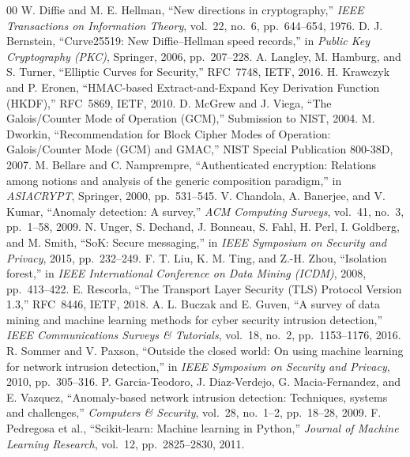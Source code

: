 \documentclass[onecolumn]{article}
\begin{document}
\begin{thebibliography}{00}
 W. Diffie and M. E. Hellman, ``New directions in cryptography,'' \emph{IEEE Transactions on Information Theory}, vol.~22, no.~6, pp.~644--654, 1976.
 D. J. Bernstein, ``Curve25519: New Diffie--Hellman speed records,'' in \emph{Public Key Cryptography (PKC)}, Springer, 2006, pp.~207--228.
 A. Langley, M. Hamburg, and S. Turner, ``Elliptic Curves for Security,'' RFC~7748, IETF, 2016.
 H. Krawczyk and P. Eronen, ``HMAC-based Extract-and-Expand Key Derivation Function (HKDF),'' RFC~5869, IETF, 2010.
 D. McGrew and J. Viega, ``The Galois/Counter Mode of Operation (GCM),'' Submission to NIST, 2004.
 M. Dworkin, ``Recommendation for Block Cipher Modes of Operation: Galois/Counter Mode (GCM) and GMAC,'' NIST Special Publication 800-38D, 2007.
 M. Bellare and C. Namprempre, ``Authenticated encryption: Relations among notions and analysis of the generic composition paradigm,'' in \emph{ASIACRYPT}, Springer, 2000, pp.~531--545.
 V. Chandola, A. Banerjee, and V. Kumar, ``Anomaly detection: A survey,'' \emph{ACM Computing Surveys}, vol.~41, no.~3, pp.~1--58, 2009.
 N. Unger, S. Dechand, J. Bonneau, S. Fahl, H. Perl, I. Goldberg, and M. Smith, ``SoK: Secure messaging,'' in \emph{IEEE Symposium on Security and Privacy}, 2015, pp.~232--249.
 F. T. Liu, K. M. Ting, and Z.-H. Zhou, ``Isolation forest,'' in \emph{IEEE International Conference on Data Mining (ICDM)}, 2008, pp.~413--422.
 E. Rescorla, ``The Transport Layer Security (TLS) Protocol Version 1.3,'' RFC~8446, IETF, 2018.
 A. L. Buczak and E. Guven, ``A survey of data mining and machine learning methods for cyber security intrusion detection,'' \emph{IEEE Communications Surveys \& Tutorials}, vol.~18, no.~2, pp.~1153--1176, 2016.
 R. Sommer and V. Paxson, ``Outside the closed world: On using machine learning for network intrusion detection,'' in \emph{IEEE Symposium on Security and Privacy}, 2010, pp.~305--316.
 P. Garcia-Teodoro, J. Diaz-Verdejo, G. Macia-Fernandez, and E. Vazquez, ``Anomaly-based network intrusion detection: Techniques, systems and challenges,'' \emph{Computers \& Security}, vol.~28, no.~1--2, pp.~18--28, 2009.
 F. Pedregosa et al., ``Scikit-learn: Machine learning in Python,'' \emph{Journal of Machine Learning Research}, vol.~12, pp.~2825--2830, 2011.
\end{thebibliography}
\vspace{12pt}
\end{document}
